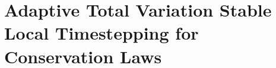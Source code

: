 


\chapter{Adaptive Total Variation Stable Local Timestepping for Conservation Laws}
\label{ch:lts}








